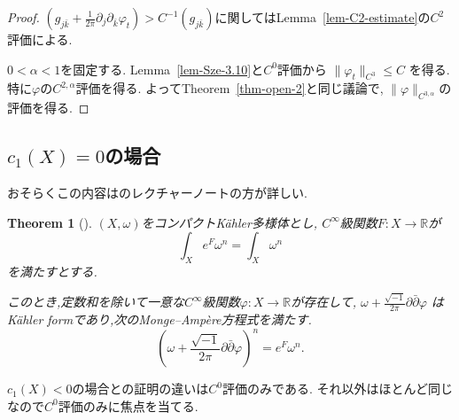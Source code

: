 \documentclass[dvipdfmx,a4paper,11pt]{article} %
\newtheorem{thm}{Theorem}[section]
\theoremstyle{definition}
\theoremstyle{remark}
\numberwithin{equation}{section}
\begin{document}
\begin{proof}
$(g_{j\bar k}+\frac{1}{2\pi}\partial_{j}\partial_{\bar k}\varphi_{t})>C^{-1}(g_{j\bar k})$に関してはLemma~\ref{lem-C2-estimate}の$C^2$評価による. 

$0<\alpha<1$を固定する. Lemma~\ref{lem-Sze-3.10}と$C^0$評価から
$\lVert\varphi_t\rVert_{C^{3}}\leq C$
を得る. 特に$\varphi$の$C^{2, \alpha}$評価を得る. よってTheorem~\ref{thm-open-2}と同じ議論で, $\lVert\varphi\rVert_{C^{3,\alpha}}$の評価を得る. 
\end{proof}


\subsection{$c_{1}(X)=0$の場合}

おそらくこの内容は\cite[Subsection 3]{Blo07}のレクチャーノートの方が詳しい.
\begin{thm}
[{\cite[Theorem 3.14]{Sze14}}]
$(X,\omega)$をコンパクトK\"ahler多様体とし,
$C^\infty$級関数$F\colon X\to\mathbb{R}$が
\[
\int_X e^F\omega^n=\int_X\omega^n
\]
を満たすとする.

このとき,定数和を除いて一意な$C^\infty$級関数$\varphi\colon X\to\mathbb{R}$が存在して,
\(
\omega+\frac{\sqrt{-1}}{2\pi}\partial\bar\partial\varphi
\)
はK\"ahler formであり,次のMonge--Amp\`ere方程式を満たす.
\[
\left(
\omega+\frac{\sqrt{-1}}{2\pi}\partial\bar\partial\varphi
\right)^n
=
e^F\omega^n.
\]
\end{thm}

$c_{1}(X)<0$の場合との証明の違いは$C^0$評価のみである. それ以外はほとんど同じなので$C^0$評価のみに焦点を当てる.
\end{document}
